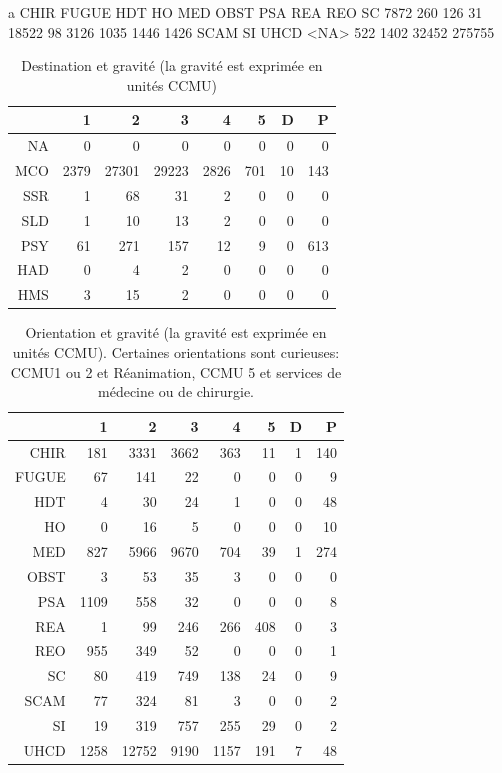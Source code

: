 \documentclass[12pt,english,french,twoside]{book}\usepackage[]{graphicx}\usepackage[]{color}
\begin{document}
a
  CHIR  FUGUE    HDT     HO    MED   OBST    PSA    REA    REO     SC 
  7872    260    126     31  18522     98   3126   1035   1446   1426 
  SCAM     SI   UHCD   <NA> 
   522   1402  32452 275755 
\begin{table}[ht]
\centering
\begin{tabular}{rrrrrrrr}
  \hline
 & 1 & 2 & 3 & 4 & 5 & D & P \\ 
  \hline
NA &   0 &   0 &   0 &   0 &   0 &   0 &   0 \\ 
  MCO & 2379 & 27301 & 29223 & 2826 & 701 &  10 & 143 \\ 
  SSR &   1 &  68 &  31 &   2 &   0 &   0 &   0 \\ 
  SLD &   1 &  10 &  13 &   2 &   0 &   0 &   0 \\ 
  PSY &  61 & 271 & 157 &  12 &   9 &   0 & 613 \\ 
  HAD &   0 &   4 &   2 &   0 &   0 &   0 &   0 \\ 
  HMS &   3 &  15 &   2 &   0 &   0 &   0 &   0 \\ 
   \hline
\end{tabular}
\caption[Destination et gravité]{Destination et gravité (la gravité est exprimée en unités CCMU)} 
\label{tab:dest_gravite}
\end{table}
\begin{table}[ht]
\centering
\begin{tabular}{rrrrrrrr}
  \hline
 & 1 & 2 & 3 & 4 & 5 & D & P \\ 
  \hline
CHIR & 181 & 3331 & 3662 & 363 &  11 &   1 & 140 \\ 
  FUGUE &  67 & 141 &  22 &   0 &   0 &   0 &   9 \\ 
  HDT &   4 &  30 &  24 &   1 &   0 &   0 &  48 \\ 
  HO &   0 &  16 &   5 &   0 &   0 &   0 &  10 \\ 
  MED & 827 & 5966 & 9670 & 704 &  39 &   1 & 274 \\ 
  OBST &   3 &  53 &  35 &   3 &   0 &   0 &   0 \\ 
  PSA & 1109 & 558 &  32 &   0 &   0 &   0 &   8 \\ 
  REA &   1 &  99 & 246 & 266 & 408 &   0 &   3 \\ 
  REO & 955 & 349 &  52 &   0 &   0 &   0 &   1 \\ 
  SC &  80 & 419 & 749 & 138 &  24 &   0 &   9 \\ 
  SCAM &  77 & 324 &  81 &   3 &   0 &   0 &   2 \\ 
  SI &  19 & 319 & 757 & 255 &  29 &   0 &   2 \\ 
  UHCD & 1258 & 12752 & 9190 & 1157 & 191 &   7 &  48 \\ 
   \hline
\end{tabular}
\caption[Orientation et gravité]{Orientation et gravité (la gravité est exprimée en unités CCMU). Certaines orientations sont curieuses: CCMU1 ou 2 et Réanimation, CCMU 5 et services de médecine ou de chirurgie.} 
\label{tab:orient_gravite}
\end{table}
\end{document}
